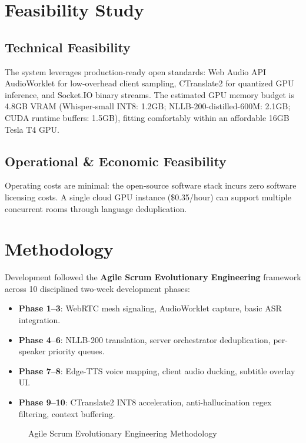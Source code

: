 \documentclass[12pt,a4paper]{report}
\begin{document}
\section{Feasibility Study}
\subsection{Technical Feasibility}
The system leverages production-ready open standards: Web Audio API AudioWorklet for low-overhead client sampling, CTranslate2 for quantized GPU inference, and Socket.IO binary streams. The estimated GPU memory budget is 4.8GB VRAM (Whisper-small INT8: 1.2GB; NLLB-200-distilled-600M: 2.1GB; CUDA runtime buffers: 1.5GB), fitting comfortably within an affordable 16GB Tesla T4 GPU.

\subsection{Operational \& Economic Feasibility}
Operating costs are minimal: the open-source software stack incurs zero software licensing costs. A single cloud GPU instance (\$0.35/hour) can support multiple concurrent rooms through language deduplication.

\section{Methodology}
Development followed the \textbf{Agile Scrum Evolutionary Engineering} framework across 10 disciplined two-week development phases:
\begin{itemize}
    \item \textbf{Phase 1--3}: WebRTC mesh signaling, AudioWorklet capture, basic ASR integration.
    \item \textbf{Phase 4--6}: NLLB-200 translation, server orchestrator deduplication, per-speaker priority queues.
    \item \textbf{Phase 7--8}: Edge-TTS voice mapping, client audio ducking, subtitle overlay UI.
    \item \textbf{Phase 9--10}: CTranslate2 INT8 acceleration, anti-hallucination regex filtering, context buffering.
\end{itemize}

\begin{figure}[H]
  \centering
  \caption{Agile Scrum Evolutionary Engineering Methodology}
  \label{fig:fig3_1}
\end{figure}
\end{document}
